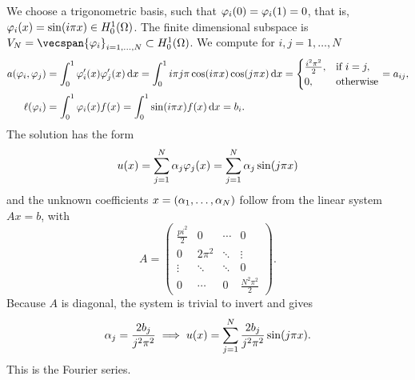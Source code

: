 \begin{example}
    We choose a trigonometric basis, such that \(\varphi_i\parentheses*{0} = \varphi_i\parentheses*{1} = 0\), that is, \(\varphi_i\parentheses*{x} = \sin\parentheses*{i\pi x} \in H_0^1\parentheses*{\Omega}\).
    The finite dimensional subspace is \(V_N = \vecspan\braces*{\varphi_i}_{i = 1, \ldots, N} \subset H_0^1\parentheses*{\Omega}\).
    We compute for \(i, j = 1, \ldots, N\)
    \begin{align*}
        a\parentheses*{\varphi_i, \varphi_j} &= \int_0^1 \varphi_i'\parentheses*{x}\varphi_j'\parentheses*{x}\d x = \int_0^1 i\pi j\pi\cos\parentheses*{i\pi x}\cos\parentheses*{j\pi x}\d x = \begin{cases}
            \frac{i^2 \pi^2}{2}, & \text{if }i = j,\\
            0, & \text{otherwise}
        \end{cases} = a_{ij},\\
        \ell\parentheses*{\varphi_i} &= \int_0^1 \varphi_i\parentheses*{x}f\parentheses*{x} = \int_0^1 \sin\parentheses*{i\pi x}f\parentheses*{x}\d x = b_i.
    \end{align*}
    The solution has the form
    \[
        u\parentheses*{x} = \sum_{j = 1}^N \alpha_j \varphi_j\parentheses*{x} = \sum_{j = 1}^N \alpha_j \sin\parentheses*{j\pi x}
    \]
    and the unknown coefficients \(x = \parentheses*{\alpha_1, \ldots, \alpha_N}\) follow from the linear system \(Ax = b\), with
    \[
        A = \begin{pmatrix}
            \frac{pi^2}{2} & 0 & \cdots & 0\\
            0 & 2\pi^2 & \ddots & \vdots\\
            \vdots & \ddots & \ddots & 0\\
            0 & \cdots & 0 & \frac{N^2 \pi^2}{2}
        \end{pmatrix}.
    \]
    Because \(A\) is diagonal, the system is trivial to invert and gives
    \[
        \alpha_j = \frac{2b_j}{j^2 \pi^2} \implies u\parentheses*{x} = \sum_{j = 1}^N \frac{2b_j}{j^2 \pi^2}\sin\parentheses*{j\pi x}.
    \]
    This is the Fourier series.
\end{example}

